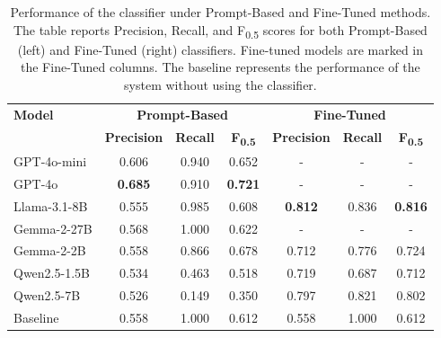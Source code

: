 \begin{table}[htbp]
\centering
\renewcommand{\arraystretch}{1.0}
\small
\setlength{\tabcolsep}{3.6mm}
\caption{Performance of the classifier under Prompt-Based and Fine-Tuned methods. The table reports Precision, Recall, and F\textsubscript{0.5} scores for both Prompt-Based (left) and Fine-Tuned (right) classifiers. Fine-tuned models are marked in the Fine-Tuned columns. The baseline represents the performance of the system without using the classifier.}
\label{tab:classifier_results}
    \begin{tabular}{lcccccc}
    \toprule[1pt]
     \multirow{2}{*}{\textbf{Model}} & \multicolumn{3}{c}{\textbf{Prompt-Based}} & \multicolumn{3}{c}{\textbf{Fine-Tuned}} \\
     \cmidrule(lr){2-4} \cmidrule(lr){5-7}
     & \textbf{Precision} & \textbf{Recall} & \textbf{F\textsubscript{0.5}} & \textbf{Precision} & \textbf{Recall} & \textbf{F\textsubscript{0.5}} \\
    \midrule
    \centering
    GPT-4o-mini & 0.606 & 0.940 & 0.652 & - & - & - \\
    GPT-4o & \textbf{0.685} & 0.910 & \textbf{0.721} & - & - & - \\
    Llama-3.1-8B & 0.555 & 0.985 & 0.608 & \textbf{0.812} & 0.836 &\textbf{ 0.816} \\
    Gemma-2-27B & 0.568 & 1.000 & 0.622 & - & - & - \\
    Gemma-2-2B & 0.558 & 0.866 & 0.678 & 0.712 & 0.776 & 0.724 \\
    Qwen2.5-1.5B & 0.534 & 0.463 & 0.518 & 0.719 & 0.687 & 0.712 \\
    Qwen2.5-7B & 0.526 & 0.149 & 0.350 & 0.797 & 0.821 & 0.802 \\
    \midrule
    Baseline & 0.558 & 1.000 & 0.612 & 0.558 & 1.000 & 0.612 \\
    \bottomrule[1pt]
    \end{tabular}
\end{table}


